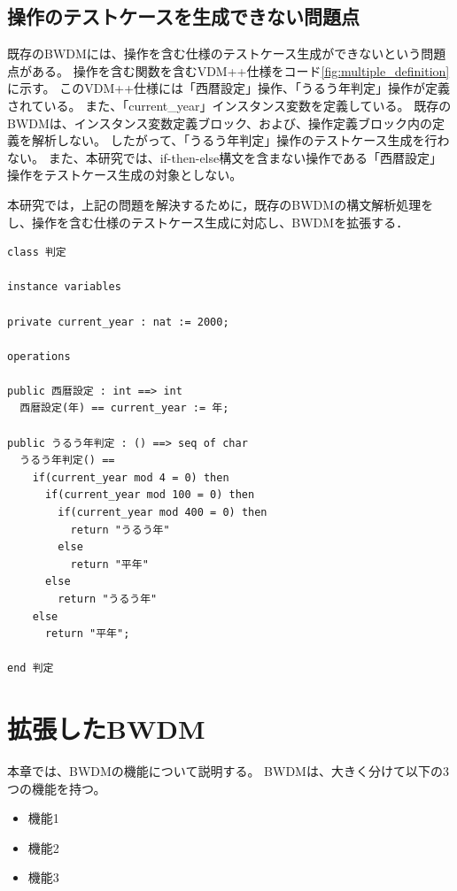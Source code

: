 \documentclass[uplatex, report, a4j, 10pt]{jsbook}
\newcommand{\tool}{BWDM}
\begin{document}
\section{操作のテストケースを生成できない問題点}\label{sec:probrem_operation}
既存の\tool{}には、操作を含む仕様のテストケース生成ができないという問題点がある。
操作を含む関数を含むVDM++仕様をコード\ref{fig:multiple_definition}に示す。
このVDM++仕様には「西暦設定」操作、「うるう年判定」操作が定義されている。
また、「current\_year」インスタンス変数を定義している。
既存のBWDMは、インスタンス変数定義ブロック、および、操作定義ブロック内の定義を解析しない。
したがって、「うるう年判定」操作のテストケース生成を行わない。
また、本研究では、if-then-else構文を含まない操作である「西暦設定」操作をテストケース生成の対象としない。

本研究では，上記の問題を解決するために，既存の\tool{}の構文解析処理をし、操作を含む仕様のテストケース生成に対応し、\tool{}を拡張する．

\lstset{language=}
\noindent\begin{minipage}{\textwidth}
  \begin{lstlisting}[caption=操作を含むVDM++仕様。,label=fig:multiple_definition]
class 判定

instance variables

private current_year : nat := 2000;

operations

public 西暦設定 : int ==> int
  西暦設定(年) == current_year := 年;

public うるう年判定 : () ==> seq of char
  うるう年判定() ==
    if(current_year mod 4 = 0) then
      if(current_year mod 100 = 0) then
        if(current_year mod 400 = 0) then
          return "うるう年"
        else
          return "平年"
      else
        return "うるう年"
    else
      return "平年";

end 判定
\end{lstlisting}
\end{minipage}

\chapter{拡張した\tool{}}\label{cha:Extended}

本章では、\tool{}の機能について説明する。
\tool{}は、大きく分けて以下の3つの機能を持つ。

\begin{itemize}
  \item 機能1
  \item 機能2
  \item 機能3
\end{itemize}
\end{document}
